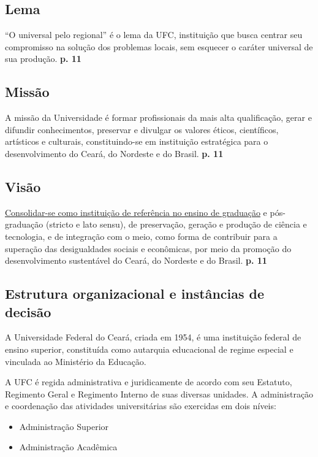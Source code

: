 \documentclass{report}
\begin{document}
\subsection{Lema}

“O universal pelo regional” é o lema da UFC, instituição que busca centrar seu compromisso na solução dos problemas locais, sem esquecer o caráter universal de sua produção.
\textbf{p. 11}

\subsection{Missão}

A missão da Universidade é formar profissionais da mais alta qualificação, gerar e difundir conhecimentos, preservar e divulgar os valores éticos, científicos, artísticos e culturais, constituindo-se em instituição estratégica para o desenvolvimento do Ceará, do Nordeste e do Brasil.
\textbf{p. 11}

\subsection{Visão}

\underline{Consolidar-se como instituição de referência no ensino de graduação} e pós-graduação (stricto e lato sensu), de preservação, geração e produção de ciência e tecnologia, e de integração com o meio, como forma de contribuir para a superação das desigualdades sociais e econômicas, por meio da promoção do desenvolvimento sustentável do Ceará, do Nordeste e do Brasil.
\textbf{p. 11}

\subsection{Estrutura organizacional e instâncias de decisão}

A Universidade Federal do Ceará, criada em 1954, é uma instituição federal de ensino superior, constituída como autarquia educacional de regime especial e vinculada ao Ministério da Educação.

A UFC é regida administrativa e juridicamente de acordo com seu Estatuto, Regimento Geral e Regimento Interno de suas diversas unidades. A administração e coordenação das atividades universitárias são exercidas em dois níveis: 

\begin{itemize}
\item Administração Superior
\item Administração Acadêmica
\end{itemize}
\end{document}
